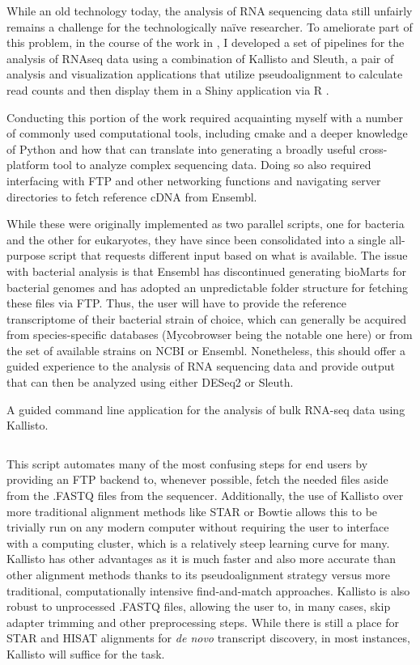 While an old technology today, the analysis of RNA sequencing data still unfairly remains a challenge for the technologically na\"{i}ve researcher. To ameliorate part of this problem, in the course of the work in \citet{Saelens2022}, I developed a set of pipelines for the analysis of RNAseq data using a combination of Kallisto and Sleuth, a pair of analysis and visualization applications that utilize pseudoalignment to calculate read counts and then display them in a Shiny application via R \citep{Pimentel2017}.

Conducting this portion of the work required acquainting myself with a number of commonly used computational tools, including cmake and a deeper knowledge of Python and how that can translate into generating a broadly useful cross-platform tool to analyze complex sequencing data. Doing so also required interfacing with FTP and other networking functions and navigating server directories to fetch reference cDNA from Ensembl.

While these were originally implemented as two parallel scripts, one for bacteria and the other for eukaryotes, they have since been consolidated into a single all-purpose script that requests different input based on what is available. The issue with bacterial analysis is that Ensembl has discontinued generating bioMarts for bacterial genomes and has adopted an unpredictable folder structure for fetching these files via FTP. Thus, the user will have to provide the reference transcriptome of their bacterial strain of choice, which can generally be acquired from species-specific databases (Mycobrowser being the notable one here) or from the set of available strains on NCBI or Ensembl. Nonetheless, this should offer a guided experience to the analysis of RNA sequencing data and provide output that can then be analyzed using either DESeq2 or Sleuth.

\begin{code}
\caption{A guided command line application for the analysis of bulk RNA-seq data using Kallisto.}
\label{blinder}

\inputminted[breaklines,frame=single,fontsize=\small]{python}{source/allKallisto.py}

\end{code}

This script automates many of the most confusing steps for end users by providing an FTP backend to, whenever possible, fetch the needed files aside from the .FASTQ files from the sequencer. Additionally, the use of Kallisto over more traditional alignment methods like STAR or Bowtie allows this to be trivially run on any modern computer without requiring the user to interface with a computing cluster, which is a relatively steep learning curve for many. Kallisto has other advantages as it is much faster and also more accurate than other alignment methods thanks to its pseudoalignment strategy versus more traditional, computationally intensive find-and-match approaches. Kallisto is also robust to unprocessed .FASTQ files, allowing the user to, in many cases, skip adapter trimming and other preprocessing steps. While there is still a place for STAR and HISAT alignments for \textit{de novo} transcript discovery, in most instances, Kallisto will suffice for the task. 

